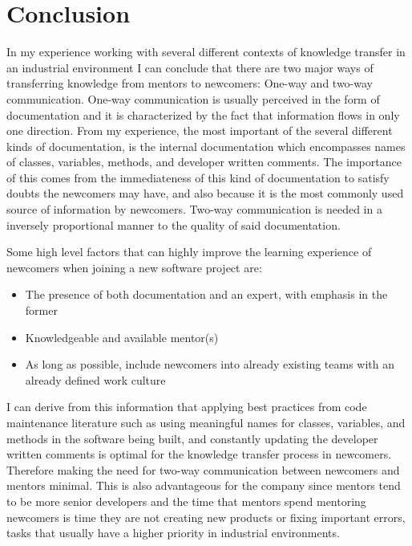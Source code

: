 \documentclass[12pt, letterpaper]{article}
\begin{document}
\section{Conclusion}

In my experience working with several different contexts of knowledge transfer in an industrial environment
I can conclude that there are two major ways of transferring knowledge from mentors to newcomers: One-way
and two-way communication. One-way communication is usually perceived in the form of documentation and it 
is characterized by the fact that information flows in only one direction. From my experience, the most 
important of the several different kinds of documentation, is the internal documentation which encompasses
names of classes, variables, methods, and developer written comments. The importance of this comes from
the immediateness of this kind of documentation to satisfy doubts the newcomers may have, and also because
it is the most commonly used source of information by newcomers. Two-way communication is needed in a inversely 
proportional manner to the quality of said documentation.

Some high level factors that can highly improve the learning experience of newcomers when joining a new software 
project are:
\begin{itemize}
  \item The presence of both documentation and an expert, with emphasis in the former
  \item Knowledgeable and available mentor(s)
  \item As long as possible, include newcomers into already existing teams with an already defined work culture 
\end{itemize}

I can derive from this information that applying best practices from code maintenance literature such as 
using meaningful names for classes, variables, and methods in the software being built, and constantly updating
the developer written comments is optimal for the knowledge transfer process in newcomers. Therefore making
the need for two-way communication between newcomers and mentors minimal. This is also advantageous for the
company since mentors tend to be more senior developers and the time that mentors spend mentoring newcomers
is time they are not creating new products or fixing important errors, tasks that usually have a higher priority
in industrial environments.



 
\end{document}
